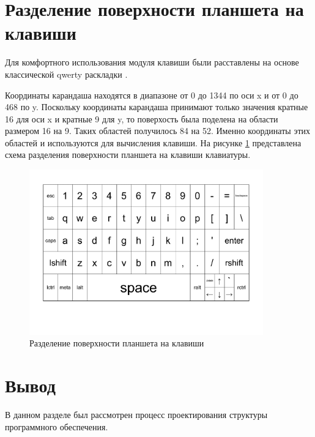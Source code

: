 \section{Разделение поверхности планшета на клавиши}

Для комфортного использования модуля клавиши были расставлены на основе классической qwerty раскладки \cite{Qwerty}.

Координаты карандаша находятся в диапазоне от 0 до 1344 по оси x и от 0 до 468 по y. Поскольку координаты карандаша принимают только значения кратные 16 для оси x и кратные 9 для y, то поверхость была поделена на области размером 16 на 9. Таких областей получилось 84 на 52. Именно координаты этих областей и используются для вычисления клавиши. На рисунке \ref{fig:keyboard} представлена схема разделения поверхности планшета на клавиши клавиатуры.

\begin{figure}[H]
    \centering
    \includegraphics[trim=3cm 4cm 3cm 1.5cm, width=0.9\textwidth]{img/keyboard.pdf}
    \caption{Разделение поверхности планшета на клавиши}
    \label{fig:keyboard}
\end{figure}

\section{Вывод}

В данном разделе был рассмотрен процесс проектирования структуры программного обеспечения.
